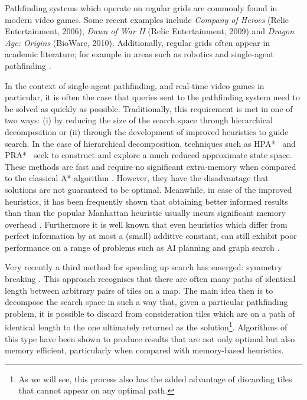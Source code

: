 Pathfinding systems which operate on regular grids are commonly found in modern video games.
Some recent examples include \emph{Company of Heroes} (Relic Entertainment, 2006), \emph{Dawn of War II} (Relic
Entertainment, 2009) and \emph{Dragon Age: Origins} (BioWare, 2010).
Additionally, regular grids often appear in academic literature; for example in areas such as robotics \cite{choset05} and
single-agent pathfinding \cite{yap02,botea04,sturtevant07,harabor08}.
\par
In the context of single-agent pathfinding, and real-time video games in particular, it is often the case that queries sent to
the pathfinding system  need to be solved as quickly as possible.
Traditionally, this requirement is met in one of two ways: (i) by reducing the size of the search space through hierarchical 
decomposition or (ii) through the development of improved heuristics to guide search.
In the case of hierarchical decomposition, techniques such as
HPA*~\cite{botea04} and PRA*~\cite{sturtevant05} seek to construct and explore
a much reduced approximate state space.
These methods are fast and require no significant extra-memory when compared to the classical
A* algorithm \cite{hart68}.
However, they have the disadvantage that solutions are not guaranteed to be optimal.
Meanwhile, in case of the improved heuristics, it has been frequently shown
that obtaining better informed results than than the popular
Manhattan heuristic usually incurs significant memory overhead 
\cite{sturtevant09,goldberg05,Cazenave:06,bjornsson06}.
Furthermore it is well known that even heuristics which differ from perfect information 
by at most a (small) additive constant, can still exhibit poor performance on a range of 
problems such as AI planning and graph search \cite{helmert08,pohl77}.
\par
Very recently a third method for speeding up search has emerged: symmetry breaking \cite{pochter10,harabor10}.
This approach recognises that there are often many paths of identical length between arbitrary pairs of tiles on a map.
The main idea then is to decompose the search space in such a way that, given a particular pathfinding problem, it is possible to
discard from consideration tiles which are on a path of identical length to the one ultimately returned as the solution\footnote{
As we will see, this process also has the added advantage of discarding tiles 
that cannot appear on any optimal path.}.
Algorithms of this type have been  shown to produce results that are not only optimal but also memory efficient, 
particularly when compared with memory-based heuristics.
